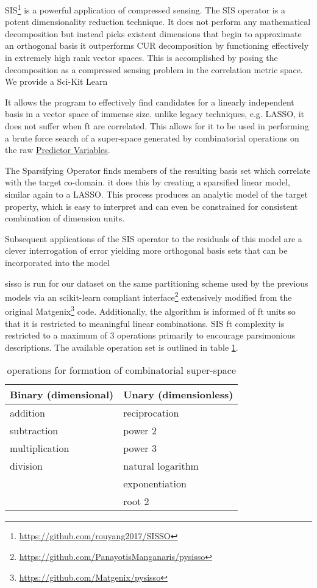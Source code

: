 \documentclass[aip, jmp, amsmath, amssymb, nofootinbib]{revtex4-2}
\begin{document}
SIS\footnote{\url{https://github.com/rouyang2017/SISSO}} is a powerful application of compressed
sensing\cite{ghiringhelli-2017-learn-physic}. The SIS operator is a
potent dimensionality reduction technique. It does not perform any
mathematical decomposition but instead picks existent dimensions that
begin to approximate an orthogonal basis it outperforms
CUR\cite{ray-2021-various-dimen,hamm-2019-cur-decom} decomposition by
functioning effectively in extremely high rank vector spaces. This is
accomplished by posing the decomposition as a compressed sensing
problem in the correlation metric space. We provide a Sci-Kit Learn

It allows the program to effectively find candidates for a linearly
independent basis in a vector space of immense size. unlike legacy
techniques, e.g. LASSO, it does not suffer when \gls{ft} are
correlated\cite{tibshirani-1996-regres-shrin,gauraha-2018-introd-to-lasso}. This
allows for it to be used in performing a brute force search of a
super-space generated by combinatorial operations on the raw \hyperref[sec:orge09f193]{Predictor Variables}.

The Sparsifying Operator finds members of the resulting basis set
which correlate with the target co-domain. it does this by creating a
sparsified linear model, similar again to a LASSO. This process
produces an analytic model of the target property, which is easy to
interpret and can even be constrained for consistent combination of
dimension units.

Subsequent applications of the SIS operator to the residuals of this
model are a clever interrogation of error\cite{mayo-1998-error-growt}
yielding more orthogonal basis sets that can be incorporated into the
model

\acrshort{sisso} is run for our dataset on the same partitioning scheme used by
the previous models via an scikit-learn
compliant\cite{buitinck-2013-api} interface\footnote{\url{https://github.com/PanayotisManganaris/pysisso}} extensively modified
from the original Matgenix\footnote{\url{https://github.com/Matgenix/pysisso}} code. Additionally, the algorithm is
informed of \gls{ft} units so that it is restricted to meaningful
linear combinations. SIS \gls{ft} complexity is restricted to a
maximum of 3 operations primarily to encourage parsimonious
descriptions. The available operation set is outlined in table
\ref{tbl:ops}.

\begin{table}[htbp]
\caption{\label{tbl:ops} operations for formation of combinatorial super-space}
\centering
\begin{tabular}{ll}
Binary (dimensional) & Unary (dimensionless)\\
\hline
addition & reciprocation\\
subtraction & power 2\\
multiplication & power 3\\
division & natural logarithm\\
 & exponentiation\\
 & root 2\\
\end{tabular}
\end{table}
\end{document}
